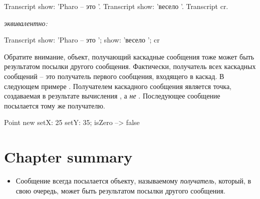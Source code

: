 \documentclass[a4paper,10pt,twoside]{book}
\begin{document}
{%

\begin{minipage}{0.35\textwidth}
\begin{code}{}
Transcript show: 'Pharo -- это '.
Transcript show: 'весело '.
Transcript cr.
\end{code}
\end{minipage}
\emph{эквивалентно:}
\begin{minipage}{0.35\textwidth}
\begin{code}{}
Transcript        
   show: 'Pharo -- это ';
   show: 'весело ';
   cr
\end{code}
\end{minipage}

Обратите внимание, объект, получающий каскадные сообщения тоже может быть результатом посылки другого сообщения.
Фактически, получатель всех каскадных сообщений -- это получатель первого сообщения, входящего в каскад. В следующем примере . Получателем каскадного сообщения  является точка, создаваемая в результате вычисления , а \emph{не} . Последующее сообщение  посылается тому же получателю.

\begin{code}{}
Point new setX: 25 setY: 35; isZero --> false
\end{code}

\section{Chapter summary}
\begin{itemize}
\item Сообщение всегда посылается объекту, называемому \emph{получатель}, который, в свою очередь, может быть результатом посылки другого сообщения.


\end{itemize}}
\end{document}
